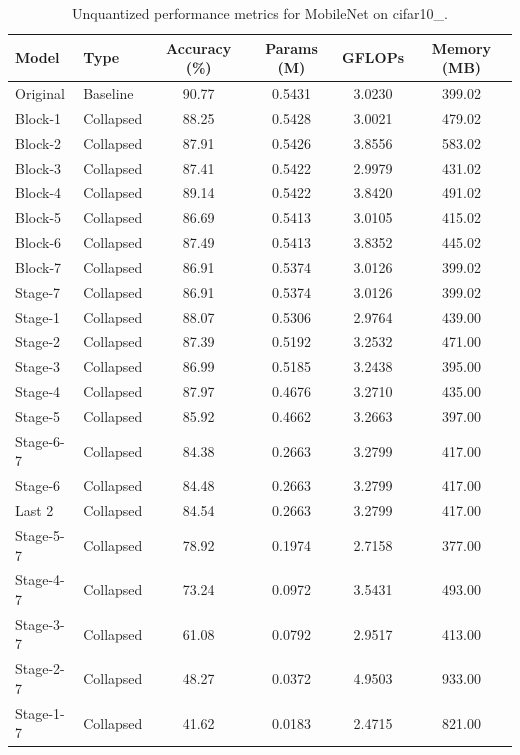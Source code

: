 \begin{table}
\caption{Unquantized performance metrics for MobileNet on cifar10_.}
\label{tab:MobileNet_cifar10__unquant}
\begin{tabular}{llcccc}
\toprule
Model & Type & Accuracy (\%) & Params (M) & GFLOPs & Memory (MB) \\
\midrule
Original & Baseline & 90.77 & 0.5431 & 3.0230 & 399.02 \\
Block-1 & Collapsed & 88.25 & 0.5428 & 3.0021 & 479.02 \\
Block-2 & Collapsed & 87.91 & 0.5426 & 3.8556 & 583.02 \\
Block-3 & Collapsed & 87.41 & 0.5422 & 2.9979 & 431.02 \\
Block-4 & Collapsed & 89.14 & 0.5422 & 3.8420 & 491.02 \\
Block-5 & Collapsed & 86.69 & 0.5413 & 3.0105 & 415.02 \\
Block-6 & Collapsed & 87.49 & 0.5413 & 3.8352 & 445.02 \\
Block-7 & Collapsed & 86.91 & 0.5374 & 3.0126 & 399.02 \\
Stage-7 & Collapsed & 86.91 & 0.5374 & 3.0126 & 399.02 \\
Stage-1 & Collapsed & 88.07 & 0.5306 & 2.9764 & 439.00 \\
Stage-2 & Collapsed & 87.39 & 0.5192 & 3.2532 & 471.00 \\
Stage-3 & Collapsed & 86.99 & 0.5185 & 3.2438 & 395.00 \\
Stage-4 & Collapsed & 87.97 & 0.4676 & 3.2710 & 435.00 \\
Stage-5 & Collapsed & 85.92 & 0.4662 & 3.2663 & 397.00 \\
Stage-6-7 & Collapsed & 84.38 & 0.2663 & 3.2799 & 417.00 \\
Stage-6 & Collapsed & 84.48 & 0.2663 & 3.2799 & 417.00 \\
Last 2 & Collapsed & 84.54 & 0.2663 & 3.2799 & 417.00 \\
Stage-5-7 & Collapsed & 78.92 & 0.1974 & 2.7158 & 377.00 \\
Stage-4-7 & Collapsed & 73.24 & 0.0972 & 3.5431 & 493.00 \\
Stage-3-7 & Collapsed & 61.08 & 0.0792 & 2.9517 & 413.00 \\
Stage-2-7 & Collapsed & 48.27 & 0.0372 & 4.9503 & 933.00 \\
Stage-1-7 & Collapsed & 41.62 & 0.0183 & 2.4715 & 821.00 \\
\bottomrule
\end{tabular}
\end{table}
